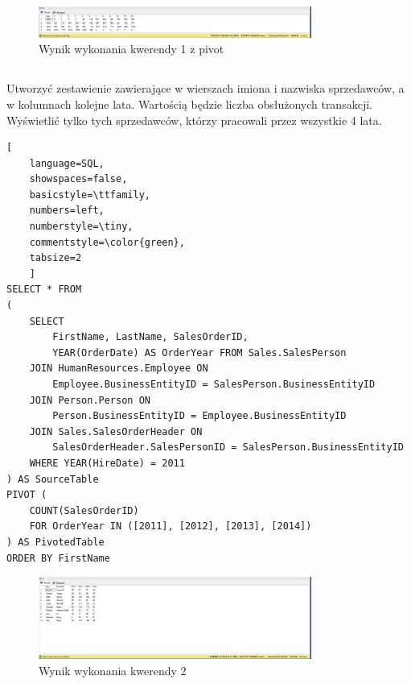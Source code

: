 \documentclass[a4paper,12pt]{article}
\begin{document}
\begin{figure}[H]
    \centering
    \includegraphics[width=0.8\textwidth]{images/01_pivot.png}
    \caption{Wynik wykonania kwerendy 1 z pivot}
    \label{fig:1_pivot}
\end{figure}

\subsection{}

Utworzyć zestawienie zawierające w wierszach imiona i nazwiska sprzedawców, a w kolumnach kolejne lata. Wartością będzie liczba obsłużonych transakcji. Wyświetlić tylko tych sprzedawców, którzy pracowali przez wszystkie 4 lata.

\begin{lstlisting}[
    language=SQL,
    showspaces=false,
    basicstyle=\ttfamily,
    numbers=left,
    numberstyle=\tiny,
    commentstyle=\color{green},
    tabsize=2
    ]
SELECT * FROM
(
	SELECT 
        FirstName, LastName, SalesOrderID, 
        YEAR(OrderDate) AS OrderYear FROM Sales.SalesPerson
	JOIN HumanResources.Employee ON 
        Employee.BusinessEntityID = SalesPerson.BusinessEntityID
	JOIN Person.Person ON 
        Person.BusinessEntityID = Employee.BusinessEntityID
	JOIN Sales.SalesOrderHeader ON 
        SalesOrderHeader.SalesPersonID = SalesPerson.BusinessEntityID
	WHERE YEAR(HireDate) = 2011
) AS SourceTable
PIVOT (
	COUNT(SalesOrderID)
	FOR OrderYear IN ([2011], [2012], [2013], [2014])
) AS PivotedTable
ORDER BY FirstName
\end{lstlisting}

\begin{figure}[H]
    \centering
    \includegraphics[width=0.8\textwidth]{images/02.png}
    \caption{Wynik wykonania kwerendy 2}
\end{figure}

\subsection{}
\end{document}
